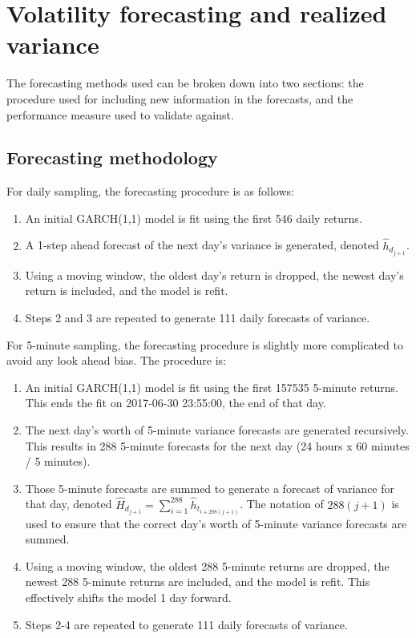 \documentclass[10pt,twoside,printwatermark=false]{pinp}
\providecommand{\tightlist}{%
  \setlength{\itemsep}{0pt}\setlength{\parskip}{0pt}}
\begin{document}
\section{Volatility forecasting and realized
variance}\label{volatility-forecasting-and-realized-variance}

The forecasting methods used can be broken down into two sections: the
procedure used for including new information in the forecasts, and the
performance measure used to validate against.

\subsection{Forecasting methodology}\label{forecasting-methodology}

For daily sampling, the forecasting procedure is as follows:

\begin{enumerate}
\def\labelenumi{\arabic{enumi})}
\tightlist
\item
  An initial GARCH(1,1) model is fit using the first 546 daily returns.
\item
  A 1-step ahead forecast of the next day's variance is generated,
  denoted \(\hat{h}_{d_{j+1}}\).
\item
  Using a moving window, the oldest day's return is dropped, the newest
  day's return is included, and the model is refit.
\item
  Steps 2 and 3 are repeated to generate 111 daily forecasts of
  variance.
\end{enumerate}

For 5-minute sampling, the forecasting procedure is slightly more
complicated to avoid any look ahead bias. The procedure is:

\begin{enumerate}
\def\labelenumi{\arabic{enumi})}
\tightlist
\item
  An initial GARCH(1,1) model is fit using the first 157535 5-minute
  returns. This ends the fit on 2017-06-30 23:55:00, the end of that
  day.
\item
  The next day's worth of 5-minute variance forecasts are generated
  recursively. This results in 288 5-minute forecasts for the next day
  (24 hours x 60 minutes / 5 minutes).
\item
  Those 5-minute forecasts are summed to generate a forecast of variance
  for that day, denoted
  \(\hat{H}_{d_{j+1}} = \sum_{i = 1}^{288} \hat{h}_{t_{i + 288(j+1)}}\).
  The notation of \(288(j+1)\) is used to ensure that the correct day's
  worth of 5-minute variance forecasts are summed.
\item
  Using a moving window, the oldest 288 5-minute returns are dropped,
  the newest 288 5-minute returns are included, and the model is refit.
  This effectively shifts the model 1 day forward.
\item
  Steps 2-4 are repeated to generate 111 daily forecasts of variance.
\end{enumerate}
\end{document}
